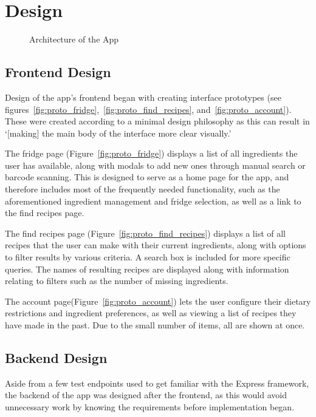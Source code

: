 \section{Design}

\begin{figure}
    \centering
    
    \caption{\label{fig:architecture}Architecture of the App}
\end{figure}

\subsection{Frontend Design}
Design of the \chef{} app's frontend began with creating interface prototypes (see figures~\ref{fig:proto_fridge},~\ref{fig:proto_find_recipes},
and~\ref{fig:proto_account}). These were created according to a minimal design philosophy as this can result in \enquote*{[making] the main
body of the interface more clear visually.}~\cite{dong_minimalist_2019}

The fridge page (Figure~\ref{fig:proto_fridge}) displays a list of all ingredients the user has available, along with modals to add new ones
through manual search or barcode scanning. This is designed to serve as a home page for the app, and therefore includes most of the frequently
needed functionality, such as the aforementioned ingredient management and fridge selection, as well as a link to the find recipes page.

The find recipes page (Figure~\ref{fig:proto_find_recipes}) displays a list of all recipes that the user can make with their current ingredients,
along with options to filter results by various criteria. A search box is included for more specific queries. The names of resulting recipes are
displayed along with information relating to filters such as the number of missing ingredients.

The account page(Figure~\ref{fig:proto_account}) lets the user configure their dietary restrictions and ingredient preferences, as well as
viewing a list of recipes they have made in the past. Due to the small number of items, all are shown at once.

\subsection{Backend Design}

Aside from a few test endpoints used to get familiar with the Express framework, the backend of the \chef{} app was designed after the frontend,
as this would avoid unnecessary work by knowing the requirements before implementation began.

